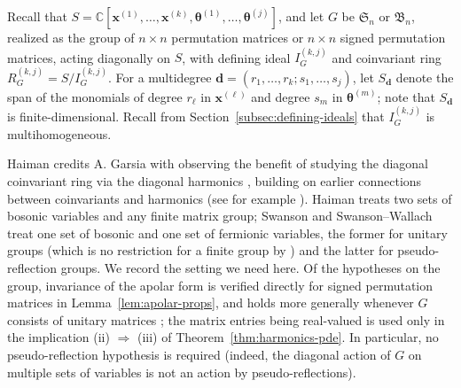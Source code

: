 \documentclass[12pt]{amsart}
\theoremstyle{plain}
\theoremstyle{definition}
\newcommand{\C}{\mathbb{C}}
\begin{document}
Recall that $S = \C[\bm{x}^{(1)}, \ldots, \bm{x}^{(k)}, \bm{\theta}^{(1)}, \ldots, \bm{\theta}^{(j)}]$, and let $G$ be $\mathfrak{S}_n$ or $\mathfrak{B}_n$, realized as the group of $n \times n$ permutation matrices or $n \times n$ signed permutation matrices, acting diagonally on $S$, with defining ideal $I_G^{(k,j)}$ and coinvariant ring $R_G^{(k,j)} = S/I_G^{(k,j)}$.
For a multidegree $\bm{d} = (r_1,\ldots,r_k;s_1,\ldots,s_j)$, let $S_{\bm{d}}$ denote the span of the monomials of degree $r_\ell$ in $\bm{x}^{(\ell)}$ and degree $s_m$ in $\bm{\theta}^{(m)}$; note that $S_{\bm{d}}$ is finite-dimensional.
Recall from Section~\ref{subsec:defining-ideals} that $I_G^{(k,j)}$ is multihomogeneous.

Haiman credits A. Garsia with observing the benefit of studying the diagonal coinvariant ring via the diagonal harmonics \cite{Haiman1994}, building on earlier connections between coinvariants and harmonics (see for example \cite{BergeronGarsia}).
Haiman \cite[Section 1.3]{Haiman1994} treats two sets of bosonic variables and any finite matrix group; Swanson \cite{SwansonPreprint} and Swanson--Wallach \cite{SwansonWallach1, SwansonWallachII} treat one set of bosonic and one set of fermionic variables, the former for unitary groups (which is no restriction for a finite group by \cite[Lemma 2.2]{SwansonPreprint}) and the latter for pseudo-reflection groups.
We record the setting we need here.
Of the hypotheses on the group, invariance of the apolar form is verified directly for signed permutation matrices in Lemma~\ref{lem:apolar-props}, and holds more generally whenever $G$ consists of unitary matrices \cite[Theorem 4.7]{SwansonPreprint}; the matrix entries being real-valued is used only in the implication (ii) $\Rightarrow$ (iii) of Theorem~\ref{thm:harmonics-pde}. 
In particular, no pseudo-reflection hypothesis is required (indeed, the diagonal action of $G$ on multiple sets of variables is not an action by pseudo-reflections).
\end{document}
